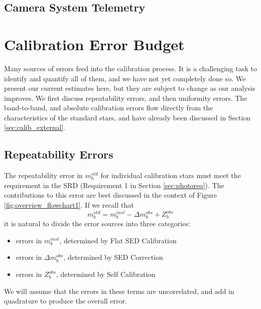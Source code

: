 \documentclass[12pt,preprint]{aastex}
\begin{document}
\subsection{Camera System Telemetry}













\section{Calibration Error Budget}
\label{sec:error_budget}
Many sources of errors feed into the calibration process.  It is a challenging task to identify and quantify all of them, and we have not yet completely done so.  We present our current estimates here, but they are subject to change as our analysis improves. We first
discuss repeatability errors, and then uniformity errors.   The band-to-band, and absolute calibration errors flow directly from the characteristics of the standard stars, and have already been discussed in Section \ref{sec:calib_external}.
\subsection{Repeatability Errors}
The repeatability error in $m_b^{std}$ for individual calibration stars must meet the requirement in the SRD (Requirement 1 in Section \ref{sec:photoreq}).  The contributions to this error are best discussed in the context of Figure \ref{fig:overview_flowchart1}.  If we recall that
\begin{equation}
m_b^{std} = m_b^{inst} - \Delta m_b^{obs} + Z_b^{obs}
\end{equation}
it is natural to divide the error sources into three categories:

\begin{itemize}
\item{errors in $m_b^{inst}$, determined by Flat SED Calibration}
\item{errors in $\Delta m_b^{obs}$, determined by SED Correction}
\item{errors in $Z_b^{obs}$, determined by Self Calibration}
\end{itemize}

We will assume that the errors in these terms are uncorrelated, and add in quadrature to produce the overall error.
\end{document}
